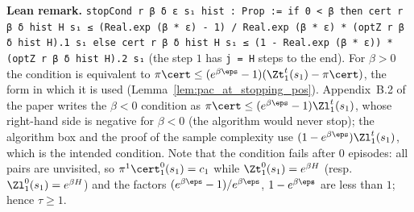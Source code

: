 \textbf{Lean remark.} \texttt{stopCond r β δ ε s₁ hist : Prop := if 0 < β then cert r β δ hist H s₁ ≤ (Real.exp (β * ε) - 1) / Real.exp (β * ε) * (optZ r β δ hist H).1 s₁ else cert r β δ hist H s₁ ≤ (1 - Real.exp (β * ε)) * (optZ r β δ hist H).2 s₁}
(the step $1$ has \texttt{j = H} steps to the end). For $\beta > 0$ the condition is
equivalent to $\pi\cert \le (e^{\beta\eps} - 1)(\Zt^t_1(s_1) - \pi\cert)$, the form in which it is
used (Lemma~\ref{lem:pac_at_stopping_pos}). Appendix~B.2 of the paper writes the $\beta < 0$
condition as $\pi \cert \le (e^{\beta\eps} - 1)\Zl^t_1(s_1)$, whose right-hand side is negative for
$\beta < 0$ (the algorithm would never stop); the algorithm box and the proof of the sample
complexity use $(1 - e^{\beta\eps})\Zl^t_1(s_1)$, which is the intended condition. Note that the
condition fails after $0$ episodes: all pairs are unvisited, so $\pi^1\cert^0_1(s_1) = c_1$ while
$\Zt^0_1(s_1) = e^{\beta H}$ (resp.\ $\Zl^0_1(s_1) = e^{\beta H}$) and the factors
$(e^{\beta\eps} - 1)/e^{\beta\eps}$, $1 - e^{\beta\eps}$ are less than $1$; hence $\tau \ge 1$.

